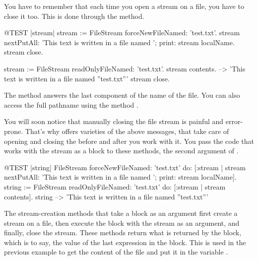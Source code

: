 \documentclass[a4paper,10pt,twoside]{book}
\begin{document}
You have to remember that each time you open a stream on a file, you have to close it too.
This is done through the  method.

\begin{code}{@TEST |stream|}
stream := FileStream forceNewFileNamed: 'test.txt'.
stream
    nextPutAll: 'This text is written in a file named ';
    print: stream localName.
stream close.

stream := FileStream readOnlyFileNamed: 'test.txt'.
stream contents. --> 'This text is written in a file named ''test.txt'''
stream close.
\end{code}



The method  answers the last component of the name of the file.
You can also access the full pathname using the method .

You will soon notice that manually closing the file stream is painful and error-prone.
That's why  offers varieties of the above messages, that take care of opening and closing the  before and after you work with it.
You pass the code that works with the stream as a block to these methods, \eg the second argument of .

\begin{code}{@TEST |string|}
FileStream
    forceNewFileNamed: 'test.txt'
    do: [:stream |
        stream
            nextPutAll: 'This text is written in a file named ';
            print: stream localName].
string := FileStream
            readOnlyFileNamed: 'test.txt'
            do: [:stream | stream contents].
string --> 'This text is written in a file named ''test.txt'''
\end{code}

The stream-creation methods that take a block as an argument first create a stream on a file, then execute the block with the stream
as an argument, and finally, close the stream.
These methods return what is returned by the block, which is to say, the value of the last expression in the block.
This is used in the previous example to get the content of the file and put it in the variable .

\end{document}
